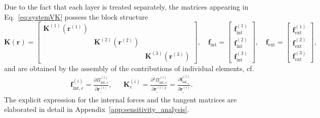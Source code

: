 \documentclass[11pt]{article}
\newcommand{\del}[2]{\mbox{$\displaystyle\frac{#1}{#2}$}}
\newcommand{\ppd}[2]{\del{\partial {#1}}{\partial{#2}}}
\newcommand{\lay}[1]{^{(#1)}}
\newcommand{\el}{_e}
\newcommand{\Etot}{\Pi}
\newcommand{\M}[1]{{\boldsymbol #1}}
\newcommand{\Mfint}{\M{f}_\mathrm{int}}
\newcommand{\Mfext}{\M{f}_{\mathrm{ext}}}
\newcommand{\Mfinte}[1]{\M{f}_{\mathrm{int},#1}}
\newcommand{\Md}{\M{r}}
\newcommand{\Mde}[2]{\Md^{(#1)}_{#2}}
\newcommand{\MKt}{\M{K}}\newcommand{\Eref}[1]{Eq.~\eqref{#1}}
\begin{document}
Due to the fact that each layer is treated separately, the matrices appearing in
Eq.~\eqref{eq:systemVK} possess the block structure
\begin{equation}\label{eq:matrices_block_diagonalVK}
\MKt( \Md )
=
\begin{bmatrix}
\MKt\lay{1}( \Md\lay{1} ) \\ 
& 
\MKt\lay{2}( \Md\lay{2} ) \\
&&  
\MKt\lay{3}( \Md\lay{3} )
\end{bmatrix}
, \quad
\Mfint
=
\begin{bmatrix}
 \Mfint\lay{1} \\
 \Mfint\lay{2} \\
 \Mfint\lay{3}
\end{bmatrix}
, \quad
\Mfext
=
\begin{bmatrix}
 \Mfext\lay{1} \\
 \Mfext\lay{2} \\
 \Mfext\lay{3} 
\end{bmatrix},
\end{equation}
and are obtained by the assembly of the contributions of individual elements, cf.~\citep{Bittnar:1996:NMM}  
\begin{align}\label{eq:internal_forcesVK}
\M{f}_{\mathrm{int},e}\lay{i}
=
\ppd{\Etot_{\mathrm{int},e}\lay{i}}{\Mde{i}{\el}}, 
&&
\M{K}_{e}\lay{i} 
=
\ppd{^2\Etot_{\mathrm{int},e}\lay{i}}{\Mde{i}{\el}{}^2} 
=
\ppd{\Mfinte{\el}\lay{i}}{\Mde{i}{\el}}.
\end{align} 
The explicit expression for the internal forces and the tangent matrices are
elaborated in detail in Appendix~\ref{app:sensitivity_analysis}. 
\end{document}
